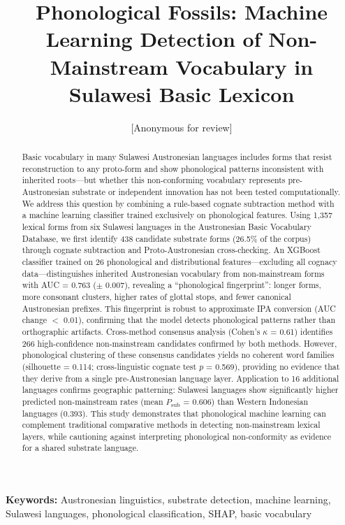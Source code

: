 \documentclass[12pt]{article}
\title{Phonological Fossils: Machine Learning Detection of Non-Mainstream Vocabulary in Sulawesi Basic Lexicon}
\author{[Anonymous for review]}
\date{}
\begin{document}
\maketitle

\begin{abstract}
Basic vocabulary in many Sulawesi Austronesian languages includes forms that resist reconstruction to any proto-form and show phonological patterns inconsistent with inherited roots---but whether this non-conforming vocabulary represents pre-Austronesian substrate or independent innovation has not been tested computationally.
We address this question by combining a rule-based cognate subtraction method with a machine learning classifier trained exclusively on phonological features.
Using 1,357 lexical forms from six Sulawesi languages in the Austronesian Basic Vocabulary Database, we first identify 438 candidate substrate forms (26.5\% of the corpus) through cognate subtraction and Proto-Austronesian cross-checking.
An XGBoost classifier trained on 26 phonological and distributional features---excluding all cognacy data---distinguishes inherited Austronesian vocabulary from non-mainstream forms with AUC = 0.763 ($\pm$ 0.007), revealing a ``phonological fingerprint'': longer forms, more consonant clusters, higher rates of glottal stops, and fewer canonical Austronesian prefixes.
This fingerprint is robust to approximate IPA conversion (AUC change $<$ 0.01), confirming that the model detects phonological patterns rather than orthographic artifacts.
Cross-method consensus analysis (Cohen's $\kappa$ = 0.61) identifies 266 high-confidence non-mainstream candidates confirmed by both methods.
However, phonological clustering of these consensus candidates yields no coherent word families (silhouette = 0.114; cross-linguistic cognate test $p$ = 0.569), providing no evidence that they derive from a single pre-Austronesian language layer.
Application to 16 additional languages confirms geographic patterning: Sulawesi languages show significantly higher predicted non-mainstream rates (mean $P_\mathrm{sub}$ = 0.606) than Western Indonesian languages (0.393).
This study demonstrates that phonological machine learning can complement traditional comparative methods in detecting non-mainstream lexical layers, while cautioning against interpreting phonological non-conformity as evidence for a shared substrate language.
\end{abstract}

\noindent\textbf{Keywords:} Austronesian linguistics, substrate detection, machine learning, Sulawesi languages, phonological classification, SHAP, basic vocabulary
\end{document}

